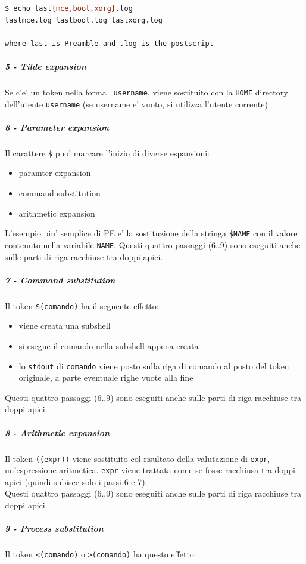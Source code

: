 \begin{lstlisting}[language=bash,basicstyle=\ttfamily,frame=single]
$ echo last{mce,boot,xorg}.log
lastmce.log lastboot.log lastxorg.log

where last is Preamble and .log is the postscript
\end{lstlisting}


\subparagraph{5 - Tilde expansion}
Se c'e' un token nella forma \texttt{~username}, viene sostituito con la \texttt{HOME} 
directory dell'utente \texttt{username} (se username e' vuoto, si utilizza l'utente
corrente)

\subparagraph{6 - Parameter expansion}
Il carattere \texttt{\$} puo' marcare l'inizio di diverse espansioni:
\begin{itemize}
	\item paramter expansion
	\item command substitution
	\item arithmetic expansion
\end{itemize}
L'esempio piu' semplice di PE e' la sostituzione della stringa \texttt{\$NAME} con il 
valore contenuto nella variabile \texttt{NAME}.
Questi quattro passaggi (6..9) sono eseguiti anche sulle parti 
di riga racchiuse tra doppi apici.

\subparagraph{7 - Command substitution}
Il token \texttt{\$(comando)} ha il seguente effetto:
\begin{itemize}
	\item viene creata una subshell 
	\item si esegue il comando nella subshell appena creata 
	\item lo \texttt{stdout} di \texttt{comando} viene posto sulla riga di comando
		al posto del token originale, a parte eventuale righe vuote alla fine
\end{itemize}
Questi quattro passaggi (6..9) sono eseguiti anche sulle parti 
di riga racchiuse tra doppi apici.

\subparagraph{8 - Arithmetic expansion}
Il token \texttt{((expr))} viene sostituito col risultato della valutazione di 
\texttt{expr}, un'espressione aritmetica. \texttt{expr} viene trattata come se fosse
racchiusa tra doppi apici (quindi subisce solo i passi 6 e 7).\\ 
Questi quattro passaggi (6..9) sono eseguiti anche sulle parti 
di riga racchiuse tra doppi apici.

\subparagraph{9 - Process substitution}
Il token \texttt{<(comando)} o \texttt{>(comando)} ha questo effetto:

